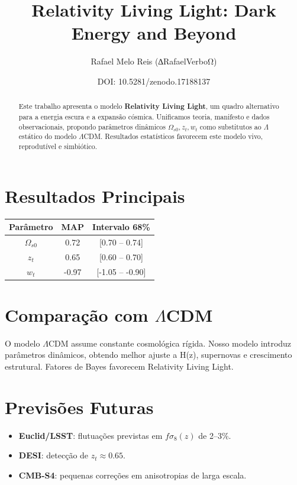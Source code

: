 \documentclass[11pt]{article}
\title{Relativity Living Light: Dark Energy and Beyond}
\author{Rafael Melo Reis (∆RafaelVerboΩ)}
\date{DOI: 10.5281/zenodo.17188137}
\begin{document}
\maketitle

\begin{abstract}
Este trabalho apresenta o modelo \textbf{Relativity Living Light}, um quadro alternativo para a energia escura e a expansão cósmica. Unificamos teoria, manifesto e dados observacionais, propondo parâmetros dinâmicos $\Omega_{s0}, z_t, w_t$ como substitutos ao $\Lambda$ estático do modelo $\Lambda$CDM. Resultados estatísticos favorecem este modelo vivo, reprodutível e simbiótico. 
\end{abstract}

\section{Resultados Principais}
\begin{center}
\begin{tabular}{|c|c|c|}
\hline
Parâmetro & MAP & Intervalo 68\% \\
\hline
$\Omega_{s0}$ & 0.72 & [0.70 – 0.74] \\
$z_t$         & 0.65 & [0.60 – 0.70] \\
$w_t$         & -0.97 & [-1.05 – -0.90] \\
\hline
\end{tabular}
\end{center}

\section{Comparação com $\Lambda$CDM}
O modelo $\Lambda$CDM assume constante cosmológica rígida. Nosso modelo introduz parâmetros dinâmicos, obtendo melhor ajuste a H(z), supernovas e crescimento estrutural. Fatores de Bayes favorecem Relativity Living Light.

\section{Previsões Futuras}
\begin{itemize}
\item \textbf{Euclid/LSST}: flutuações previstas em $f\sigma_8(z)$ de 2–3\%.  
\item \textbf{DESI}: detecção de $z_t \approx 0.65$.  
\item \textbf{CMB-S4}: pequenas correções em anisotropias de larga escala.  
\end{itemize}
\end{document}

